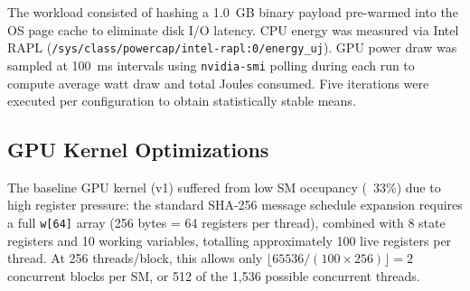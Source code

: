 The workload consisted of hashing a 1.0~GB binary payload pre-warmed into the OS page cache to eliminate disk I/O latency. CPU energy was measured via Intel RAPL (\texttt{/sys/class/powercap/intel-rapl:0/energy\_uj}). GPU power draw was sampled at 100~ms intervals using \texttt{nvidia-smi} polling during each run to compute average watt draw and total Joules consumed. Five iterations were executed per configuration to obtain statistically stable means.

\subsection{GPU Kernel Optimizations}
\label{sec:gpu_opt}

The baseline GPU kernel (v1) suffered from low SM occupancy (~33\%) due to high register pressure: the standard SHA-256 message schedule expansion requires a full \texttt{w[64]} array (256 bytes = 64 registers per thread), combined with 8 state registers and 10 working variables, totalling approximately 100 live registers per thread. At 256 threads/block, this allows only $\lfloor 65536 / (100 \times 256) \rfloor = 2$ concurrent blocks per SM, or 512 of the 1,536 possible concurrent threads.

